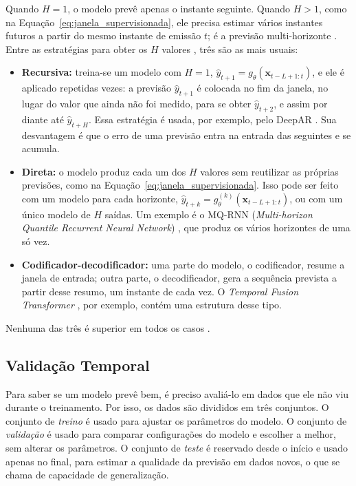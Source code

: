 Quando \(H=1\), o modelo prevê apenas o instante seguinte. Quando \(H>1\), como na Equação~\ref{eq:janela_supervisionada}, ele precisa estimar vários instantes futuros a partir do mesmo instante de emissão \(t\); é a previsão multi-horizonte \cite{lim2021survey,benidis2022deep}. Entre as estratégias para obter os \(H\) valores \cite{taieb2012review}, três são as mais usuais:

\begin{itemize}
    \item \textbf{Recursiva:} treina-se um modelo com \(H=1\), \(\hat{y}_{t+1}=g_{\theta}(\mathbf{x}_{t-L+1:t})\), e ele é aplicado repetidas vezes: a previsão \(\hat{y}_{t+1}\) é colocada no fim da janela, no lugar do valor que ainda não foi medido, para se obter \(\hat{y}_{t+2}\), e assim por diante até \(\hat{y}_{t+H}\). Essa estratégia é usada, por exemplo, pelo DeepAR \cite{salinas2020deepar}. Sua desvantagem é que o erro de uma previsão entra na entrada das seguintes e se acumula.
    \item \textbf{Direta:} o modelo produz cada um dos \(H\) valores sem reutilizar as próprias previsões, como na Equação~\ref{eq:janela_supervisionada}. Isso pode ser feito com um modelo para cada horizonte, \(\hat{y}_{t+k}=g_{\theta}^{(k)}(\mathbf{x}_{t-L+1:t})\), ou com um único modelo de \(H\) saídas. Um exemplo é o MQ-RNN (\textit{Multi-horizon Quantile Recurrent Neural Network}) \cite{wen2017mqrnn}, que produz os vários horizontes de uma só vez.
    \item \textbf{Codificador-decodificador:} uma parte do modelo, o codificador, resume a janela de entrada; outra parte, o decodificador, gera a sequência prevista a partir desse resumo, um instante de cada vez. O \textit{Temporal Fusion Transformer} \cite{lim2021tft}, por exemplo, contém uma estrutura desse tipo.
\end{itemize}

Nenhuma das três é superior em todos os casos \cite{taieb2012review}.

\subsection{Validação Temporal}
\label{sec:validacao_temporal}

Para saber se um modelo prevê bem, é preciso avaliá-lo em dados que ele não viu durante o treinamento. Por isso, os dados são divididos em três conjuntos. O conjunto de \emph{treino} é usado para ajustar os parâmetros do modelo. O conjunto de \emph{validação} é usado para comparar configurações do modelo e escolher a melhor, sem alterar os parâmetros. O conjunto de \emph{teste} é reservado desde o início e usado apenas no final, para estimar a qualidade da previsão em dados novos, o que se chama de capacidade de generalização.

